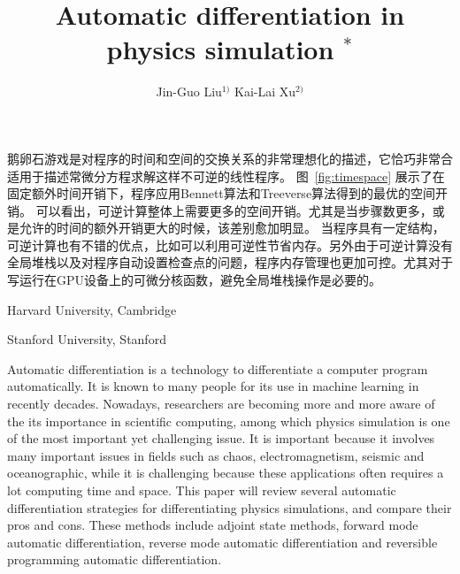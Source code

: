 \documentclass[A4,twoside,UTF8]{ctexart}
\begin{document}
鹅卵石游戏是对程序的时间和空间的交换关系的非常理想化的描述，它恰巧非常合适用于描述常微分方程求解这样不可逆的线性程序。
图~\ref{fig:timespace} 展示了在固定额外时间开销下，程序应用Bennett算法和Treeverse算法得到的最优的空间开销。
可以看出，可逆计算整体上需要更多的空间开销。尤其是当步骤数更多，或是允许的时间的额外开销更大的时候，该差别愈加明显。
当程序具有一定结构，可逆计算也有不错的优点，比如可以利用可逆性节省内存。另外由于可逆计算没有全局堆栈以及对程序自动设置检查点的问题，程序内存管理也更加可控。尤其对于写运行在GPU设备上的可微分核函数，避免全局堆栈操作是必要的。


%
%
%
%
%

\bigskip




\newpage

\title{Automatic differentiation in physics simulation $^{\ast}$}%




\author{Jin-Guo Liu$^{1)}$ \quad Kai-Lai Xu$^{2)}$}

\address{1)}{Harvard University, Cambridge }
\address{2)}{Stanford University, Stanford }




\eabstract{}

\small Automatic differentiation is a technology to differentiate a computer program automatically. It is known to many people for its use in machine learning in recently decades. Nowadays, researchers are becoming more and more aware of the its importance in scientific computing, among which physics simulation is one of the most important yet challenging issue. It is important because it involves many important issues in fields such as chaos, electromagnetism, seismic and oceanographic, while it is challenging because these applications often requires a lot computing time and space. This paper will review several automatic differentiation strategies for differentiating physics simulations, and compare their pros and cons. These methods include adjoint state methods, forward mode automatic differentiation, reverse mode automatic differentiation and reversible programming automatic differentiation.


\end{document}
